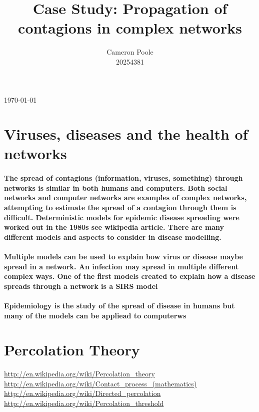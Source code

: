 \documentclass{article}
\begin{document}
\title{Case Study: Propagation of contagions in complex networks}
\author{Cameron Poole\\
	20254381}
\today
\maketitle

\section{Viruses, diseases and the health of networks}
\paragraph{
The spread of contagions (information, viruses, something) through networks is similar in both humans and computers.
Both social networks and computer networks are examples of complex networks, attempting to estimate the spread of a contagion through them is difficult. 
Deterministic models for epidemic disease spreading were worked out in the 1980s see wikipedia article.
There are many different models and aspects to consider in disease modelling. }

\paragraph{
Multiple models can be used to explain how virus or disease maybe spread in a network. 
An infection may spread in multiple different complex ways. One of the first models created to explain how a disease spreads through a network is a 
SIRS model}

\paragraph{Epidemiology is the study of the spread of disease in humans but many of the models can be appliead to computerws}

\section{Percolation Theory}
\url{http://en.wikipedia.org/wiki/Percolation_theory }\\
\url{http://en.wikipedia.org/wiki/Contact_process_(mathematics)} \\
\url{http://en.wikipedia.org/wiki/Directed_percolation}\\
\url{http://en.wikipedia.org/wiki/Percolation_threshold}\\
\end{document}
